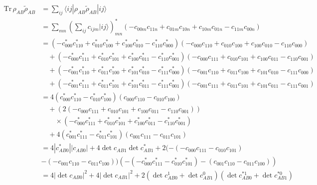 \begin{equation}
	\begin{aligned}
		\mathrm{Tr}\,\rho_{AB} \tilde{\rho}_{AB}
		&= \sum_{i j}
		\langle i j |
		\rho_{AB} \tilde{\rho}_{AB}
		| i j \rangle \\
		&= \sum_{m n}
		\left(
		\sum_{i j} c_{i j m} | i j \rangle
		\right)^{*}_{mn}
		\left(
		- c_{00m} c_{11n}
		+ c_{01m} c_{10n}
		+ c_{10m} c_{01n}
		- c_{11m} c_{00n}
		\right) \\
		&= (-c^{*}_{000} c^{*}_{110}
		+ c^{*}_{010} c^{*}_{100}
		+ c^{*}_{100} c^{*}_{010}
		- c^{*}_{110} c^{*}_{000})
		(-c_{000} c_{110}
		+ c_{010} c_{100}
		+ c_{100} c_{010}
		- c_{110} c_{000}) \\
		&\quad + (-c^{*}_{000} c^{*}_{111}
		+ c^{*}_{010} c^{*}_{101}
		+ c^{*}_{100} c^{*}_{011}
		- c^{*}_{110} c^{*}_{001})
		(-c_{000} c_{111}
		+ c_{010} c_{101}
		+ c_{100} c_{011}
		- c_{110} c_{001}) \\
		&\quad + (-c^{*}_{001} c^{*}_{110}
		+ c^{*}_{011} c^{*}_{100}
		+ c^{*}_{101} c^{*}_{010}
		- c^{*}_{111} c^{*}_{000})
		(-c_{001} c_{110}
		+ c_{011} c_{100}
		+ c_{101} c_{010}
		- c_{111} c_{000}) \\
		&\quad + (-c^{*}_{001} c^{*}_{111}
		+ c^{*}_{011} c^{*}_{101}
		+ c^{*}_{101} c^{*}_{011}
		- c^{*}_{111} c^{*}_{001})
		(-c_{001} c_{111}
		+ c_{011} c_{101}
		+ c_{101} c_{011}
		- c_{111} c_{001})\\
		&= 4 (c^{*}_{000} c^{*}_{110}
		- c^{*}_{010} c^{*}_{100})
		(c_{000} c_{110}
		- c_{010} c_{100}) \\
		&\quad + (2 (-c_{000} c_{111}
		+ c_{010} c_{101}
		+ c_{100} c_{011}
		- c_{110} c_{001})) \\
		&\qquad \times
		(-c^{*}_{000} c^{*}_{111}
		+ c^{*}_{010} c^{*}_{101}
		+ c^{*}_{100} c^{*}_{011}
		- c^{*}_{110} c^{*}_{001}) \\
		&\quad + 4 (c^{*}_{001} c^{*}_{111}
		- c^{*}_{011} c^{*}_{101})
		(c_{001} c_{111}
		- c_{011} c_{101})\\
		&= 4 |c_{AB0}^{*}| |c_{AB0}|+ 4 \det c_{AB1} \det c_{AB1}^{*}+2(-(-c_{000}c_{111}-c_{010}c_{101})\\
		&-(-c_{001}c_{110}-c_{011}c_{100}))(-(-c^{*}_{000} c^{*}_{111}-c^{*}_{010} c^{*}_{101})-(c_{001}c_{110}-c_{011}c_{100}))\\
		&= 4 |\det c_{AB0}|^2
		+ 4 |\det c_{AB1}|^2
		+ 2 (\det c_{AB0}^1 + \det c_{AB1}^0)(\det c^{*1}_{AB0} + \det c^{*0}_{AB1})
	\end{aligned}
\end{equation}


